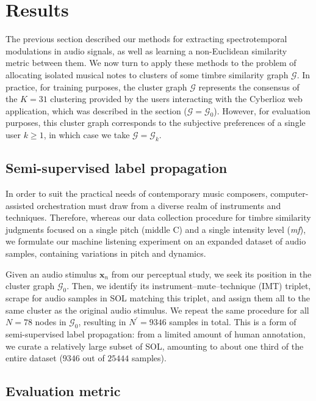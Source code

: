 \documentclass{bmcart}
\newcommand{\vl}[1]{\textcolor{red}{VL: #1}\xspace}
\newcommand{\lnameref}[1]{%
\bgroup
\let\nmu\MakeLowercase
\nameref{#1}\egroup}
\newcommand{\nmu}{}
\begin{document}
\section*{\nmu Results}
\label{sec:results}

The previous section described our methods for extracting spectrotemporal modulations in audio signals, as well as learning a non-Euclidean similarity metric between them.
We now turn to apply these methods to the problem of allocating isolated musical notes to clusters of some timbre similarity graph $\mathcal{G}$.
In practice, for training purposes, the cluster graph $\mathcal{G}$ represents the consensus of the $K=31$ clustering provided by the users interacting with the Cyberlioz web application, which was described in the \lnameref{sec:data-collection} section ($\mathcal{G}=\mathcal{G}_0$).
However, for evaluation purposes, this cluster graph corresponds to the subjective preferences of a single user $k\geq 1$, in which case we take $\mathcal{G}=\mathcal{G}_k$.


\subsection*{Semi-supervised label propagation}

In order to suit the practical needs of contemporary music composers, computer-assisted orchestration must draw from a diverse realm of instruments and techniques.
Therefore, whereas our data collection procedure for timbre similarity judgments focused on a single pitch (middle C) and a single intensity level (\emph{mf}), we formulate our machine listening experiment on an expanded dataset of audio samples, containing variations in pitch and dynamics.

Given an audio stimulus $\boldsymbol{x}_n$ from our perceptual study, we seek its position in the cluster graph $\mathcal{G}_0$.
Then, we identify its instrument--mute--technique (IMT) triplet, scrape for audio samples in SOL matching this triplet, and assign them all to the same cluster as the original audio stimulus.
We repeat the same procedure for all $N=78$ nodes in $\mathcal{G}_0$, resulting in $N^\prime = 9346$ samples in total.
This is a form of semi-supervised label propagation: from a limited amount of human annotation, we curate a relatively large subset of SOL, amounting to about one third of the entire dataset ($9346$ out of $25444$ samples). %



\subsection*{Evaluation metric}
\end{document}
